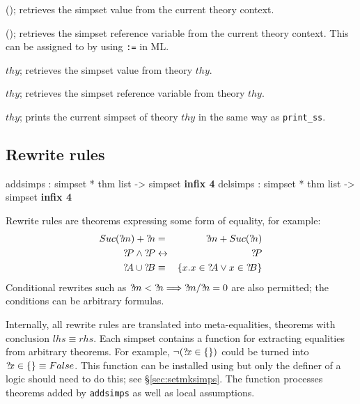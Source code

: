 \begin{ttdescription}
  
\item[\ttindexbold{simpset}();] retrieves the simpset value from the
  current theory context.
  
\item[\ttindexbold{simpset_ref}();] retrieves the simpset reference
  variable from the current theory context.  This can be assigned to
  by using \texttt{:=} in ML.
  
\item[\ttindexbold{simpset_of} $thy$;] retrieves the simpset value
  from theory $thy$.
  
\item[\ttindexbold{simpset_ref_of} $thy$;] retrieves the simpset
  reference variable from theory $thy$.

\item[\ttindexbold{print_simpset} $thy$;] prints the current simpset
  of theory $thy$ in the same way as \texttt{print_ss}.

\end{ttdescription}


\subsection{Rewrite rules}
\begin{ttbox}
addsimps : simpset * thm list -> simpset \hfill{\bf infix 4}
delsimps : simpset * thm list -> simpset \hfill{\bf infix 4}
\end{ttbox}

 Rewrite rules are theorems expressing some
form of equality, for example:
\begin{eqnarray*}
  Suc(\Var{m}) + \Var{n} &=&      \Var{m} + Suc(\Var{n}) \\
  \Var{P}\conj\Var{P}    &\bimp&  \Var{P} \\
  \Var{A} \un \Var{B} &\equiv& \{x.x\in \Var{A} \disj x\in \Var{B}\}
\end{eqnarray*}
Conditional rewrites such as ${?\!m}<{?\!n} \Longrightarrow {?\!m}/{?\!n} =
0$ are also permitted; the conditions can be arbitrary formulas.

Internally, all rewrite rules are translated into meta-equalities,
theorems with conclusion $lhs \equiv rhs$.  Each simpset contains a
function for extracting equalities from arbitrary theorems.  For
example, $\neg({?\!x}\in \{\})$ could be turned into ${?\!x}\in \{\}
\equiv False$.  This function can be installed using
 but only the definer of a logic should need to do
this; see \S\ref{sec:setmksimps}.  The function processes theorems
added by \texttt{addsimps} as well as local assumptions.


